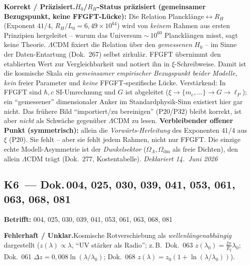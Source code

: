 \smallskip\noindent\textbf{Korrekt / Präzisiert.}\quad \textbf{$H_0$/$R_H$-Status präzisiert (gemeinsamer Bezugspunkt, keine FFGFT-Lücke):} Die Relation Plancklänge$\leftrightarrow R_H$ (Exponent $41/4$, $R_H/L_0 = 6{,}49\times10^{64}$) wird von \emph{keinem} Rahmen aus ersten Prinzipien hergeleitet -- warum das Universum $\sim$\,$10^{60}$ Plancklängen misst, sagt keine Theorie.
  \newline
  $\Lambda$CDM fixiert die Relation über den \emph{gemessenen} $H_0$ -- im Sinne der Daten-Entartung (Dok.~267) selbst zirkulär. FFGFT übernimmt den etablierten Wert zur Vergleichbarkeit und notiert ihn in $\xi$-Schreibweise. Damit ist die kosmische Skala ein \emph{gemeinsamer empirischer Bezugspunkt beider Modelle}, \emph{kein} freier Parameter und \emph{keine} FFGFT-spezifische Lücke.
  \newline
  Verstärkend: In FFGFT sind $\hbar, c$ SI-Umrechnung und $G$ ist abgeleitet ($\xi\to\{m_e,\ldots\}\to G\to\ell_P$); ein \enquote{gemessener} dimensionaler Anker im Standardphysik-Sinn existiert hier gar nicht. Das frühere Bild \enquote{importiert/zu bereinigen} (P20/P32) bleibt korrekt, ist aber \emph{nicht} als Schwäche gegenüber $\Lambda$CDM zu lesen.
  \newline
  \textbf{Verbleibender offener Punkt (symmetrisch):} allein die \emph{Vorwärts-Herleitung} des Exponenten $41/4$ aus $\xi$ (P20). Sie fehlt -- aber sie fehlt jedem Rahmen, nicht nur FFGFT. Die einzige echte Modell-Asymmetrie ist der \emph{Dunkelsektor} ($\Omega_\Lambda, \Omega_\text{dm}$ als freie Dichten), den allein $\Lambda$CDM trägt (Dok.~277, Kostentabelle). \emph{Deklariert 14.~Juni 2026}


\medskip


\subsection*{K6~--- Dok.\,004, 025, 030, 039, 041, 053, 061, 063, 068, 081}

\noindent\textbf{Betrifft:} 004, 025, 030, 039, 041, 053, 061, 063, 068, 081


\smallskip\noindent\textbf{Fehlerhaft / Unklar.}\quad Kosmische Rotverschiebung als \emph{wellenlängenabhängig} dargestellt ($z(\lambda)\propto\lambda$, \enquote{UV stärker als Radio}; z.\,B.\ Dok.~063 $z(\lambda_0)=\tfrac{\xi x}{E_\xi}\lambda_0$; Dok.~061 $\Delta z=0{,}008\ln(\lambda/\lambda_0)$; Dok.~068 $z(\lambda)=z_0(1+\ln(\lambda/\lambda_0))$).


